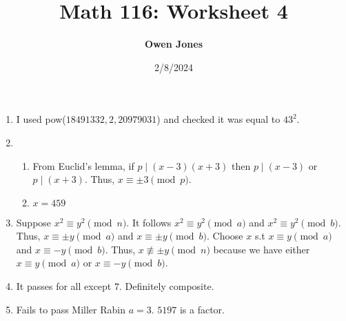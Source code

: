 \documentclass[10pt]{article}
\title{\bf Math 116: Worksheet 4}
\date{2/8/2024}
\author{\bf Owen Jones}
\begin{document}
\maketitle
\begin{enumerate}[label= \arabic*.]
    \item I used pow($18491332,2,20979031$) and checked it was equal to $43^2$.
    \item \begin{enumerate}
        \item From Euclid's lemma, if $p\mid (x-3)(x+3)$ then $p\mid (x-3)$ or $p\mid (x+3)$. Thus, $x\equiv \pm3\pmod{p}$.
        \item $x=459$
    \end{enumerate}
    \item Suppose $x^2\equiv y^2\pmod{n}$. It follows $x^2\equiv y^2\pmod{a}$ and $x^2\equiv y^2\pmod{b}$. 
    Thus, $x\equiv \pm y\pmod{a}$ and $x\equiv \pm y\pmod{b}$.
    Choose $x$ s.t $x\equiv y\pmod{a}$ and $x\equiv-y\pmod{b}$.
    Thus, $x\not\equiv \pm y\pmod{n}$ because we have either $x\equiv y\pmod{a}$ or $x\equiv-y\pmod{b}$.
    \item It passes for all except $7$. Definitely composite.
    \item Fails to pass Miller Rabin $a=3$. $5197$ is a factor.
    
\end{enumerate}
\end{document}
